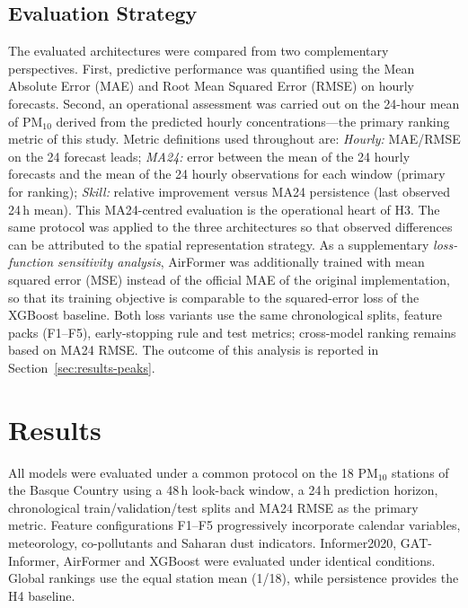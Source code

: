\documentclass[11pt]{article}
\newcommand{\revnew}[1]{\textcolor{orange!75!black}{#1}}
\begin{document}
\subsection{Evaluation Strategy}
\label{sec:evaluation-strategy}

The evaluated architectures were compared from two complementary perspectives. First, predictive performance was quantified using the Mean Absolute Error (MAE) and Root Mean Squared Error (RMSE) on hourly forecasts. Second, an operational assessment was carried out on the 24-hour mean of PM$_{10}$ derived from the predicted hourly concentrations---the primary ranking metric of this study. Metric definitions used throughout are: \emph{Hourly:} MAE/RMSE on the 24 forecast leads; \emph{MA24:} error between the mean of the 24 hourly forecasts and the mean of the 24 hourly observations for each window (primary for ranking); \emph{Skill:} relative improvement versus MA24 persistence (last observed 24\,h mean). This MA24-centred evaluation is the operational heart of H3. The same protocol was applied to the three architectures so that observed differences can be attributed to the spatial representation strategy. \revnew{As a supplementary \emph{loss-function sensitivity analysis}, AirFormer was additionally trained with mean squared error (MSE) instead of the official MAE of the original implementation, so that its training objective is comparable to the squared-error loss of the XGBoost baseline. Both loss variants use the same chronological splits, feature packs (F1--F5), early-stopping rule and test metrics; cross-model ranking remains based on MA24 RMSE. The outcome of this analysis is reported in Section~\ref{sec:results-peaks}.}

\section{Results}
\label{sec:results}

All models were evaluated under a common protocol on the 18 PM$_{10}$ stations of the Basque Country using a 48\,h look-back window, a 24\,h prediction horizon, chronological train/validation/test splits and MA24 RMSE as the primary metric. Feature configurations F1--F5 progressively incorporate calendar variables, meteorology, co-pollutants and Saharan dust indicators. Informer2020, GAT-Informer, AirFormer and XGBoost were evaluated under identical conditions. Global rankings use the equal station mean (1/18), while persistence provides the H4 baseline.
\end{document}
